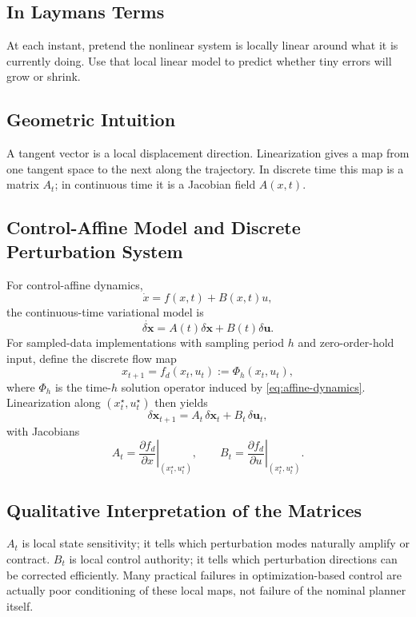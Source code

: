 \documentclass[11pt,letterpaper]{article}
\newcommand{\dx}{\delta\mathbf{x}}
\newcommand{\du}{\delta\mathbf{u}}
\begin{document}
\subsection{In Laymans Terms}
At each instant, pretend the nonlinear system is locally linear around what it is currently doing. Use that local linear model to predict whether tiny errors will grow or shrink.

\subsection{Geometric Intuition}
A tangent vector is a local displacement direction. Linearization gives a map from one tangent space to the next along the trajectory. In discrete time this map is a matrix $A_t$; in continuous time it is a Jacobian field $A(x,t)$.

\subsection{Control-Affine Model and Discrete Perturbation System}
For control-affine dynamics,
\begin{equation}
\dot x = f(x,t) + B(x,t)u,
\label{eq:affine-dynamics}
\end{equation}
the continuous-time variational model is
\begin{equation}
\dot{\dx} = A(t)\dx + B(t)\du.
\label{eq:ct-variational-control-affine}
\end{equation}
For sampled-data implementations with sampling period $h$ and zero-order-hold input, define the discrete flow map
\begin{equation}
x_{t+1} = f_d(x_t,u_t) := \Phi_h(x_t,u_t),
\label{eq:discrete-flow-map}
\end{equation}
where $\Phi_h$ is the time-$h$ solution operator induced by \eqref{eq:affine-dynamics}. Linearization along $(x_t^\star,u_t^\star)$ then yields
\begin{equation}
\dx_{t+1} = A_t\,\dx_t + B_t\,\du_t,
\label{eq:discrete-perturbation}
\end{equation}
with Jacobians
\begin{equation}
A_t = \left.\frac{\partial f_d}{\partial x}\right|_{(x_t^\star,u_t^\star)},
\qquad
B_t = \left.\frac{\partial f_d}{\partial u}\right|_{(x_t^\star,u_t^\star)}.
\label{eq:ab-jacobians}
\end{equation}

\subsection{Qualitative Interpretation of the Matrices}
$A_t$ is local state sensitivity; it tells which perturbation modes naturally amplify or contract. $B_t$ is local control authority; it tells which perturbation directions can be corrected efficiently. Many practical failures in optimization-based control are actually poor conditioning of these local maps, not failure of the nominal planner itself.
\end{document}
